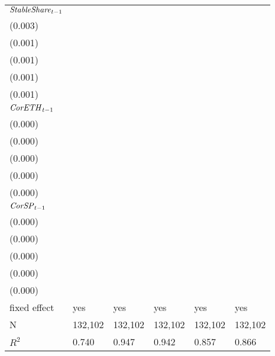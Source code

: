 \begin{tabular}{llllll}
${{\it StableShare}}_{t-1}$  &   \makecell{$0.078^{***}$ \\ (0.003)} &  \makecell{$-0.008^{***}$ \\ (0.001)} &  \makecell{$-0.007^{***}$ \\ (0.001)} &   \makecell{$0.020^{***}$ \\ (0.001)} &   \makecell{$0.011^{***}$ \\ (0.001)} \\
${{\it CorETH}}_{t-1}$       &  \makecell{$-0.001^{***}$ \\ (0.000)} &      \makecell{$0.000^{}$ \\ (0.000)} &      \makecell{$0.000^{}$ \\ (0.000)} &  \makecell{$-0.000^{***}$ \\ (0.000)} &  \makecell{$-0.000^{***}$ \\ (0.000)} \\
${{\it CorSP}}_{t-1}$        &      \makecell{$0.000^{}$ \\ (0.000)} &     \makecell{$-0.000^{}$ \\ (0.000)} &     \makecell{$-0.000^{}$ \\ (0.000)} &   \makecell{$0.000^{***}$ \\ (0.000)} &   \makecell{$0.000^{***}$ \\ (0.000)} \\
\midrule fixed effect        &                                   yes &                                   yes &                                   yes &                                   yes &                                   yes \\
N                            &                               132,102 &                               132,102 &                               132,102 &                               132,102 &                               132,102 \\
$R^2$                        &                                 0.740 &                                 0.947 &                                 0.942 &                                 0.857 &                                 0.866 \\
\bottomrule
\end{tabular}
